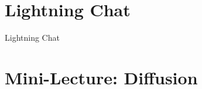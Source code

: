 \documentclass[10pt]{beamer}
\begin{document}
%
%
%
%
%	




\section{Lightning Chat}

\begin{frame}[standout]
Lightning Chat
\end{frame}

\section{Mini-Lecture: Diffusion}
\end{document}
